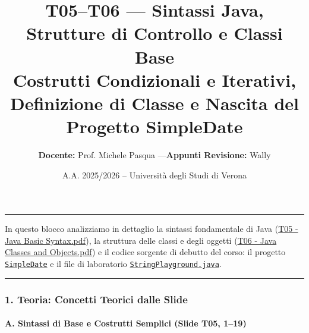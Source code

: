 \documentclass[11pt,a4paper]{article}
\title{\Huge\bfseries\sffamily\color{brandblue} T05–T06 --- Sintassi Java, Strutture di Controllo e Classi Base \\[0.3em] \large\sffamily Costrutti Condizionali e Iterativi, Definizione di Classe e Nascita del Progetto SimpleDate}
\author{\textbf{Docente:} Prof. Michele Pasqua \quad---\quad \textbf{Appunti Revisione:} Wally}
\date{A.A. 2025/2026 -- Universit\`a degli Studi di Verona}
\newcommand{\passthrough}[1]{#1}
\begin{document}
\maketitle
\thispagestyle{fancy}
\vspace{-1.2em}
\noindent\textcolor{brandblue}{\rule{\textwidth}{0.8pt}}
\vspace{1.2em}

In questo blocco analizziamo in dettaglio la sintassi fondamentale di
Java
(\href{file:///home/wally/Documenti/GitHub/Programmazione-II/25-26/Teoria-e-Esercitazioni/Slides-20260902/T05\%20-\%20Java\%20Basic\%20Syntax.pdf}{T05
- Java Basic Syntax.pdf}), la struttura delle classi e degli oggetti
(\href{file:///home/wally/Documenti/GitHub/Programmazione-II/25-26/Teoria-e-Esercitazioni/Slides-20260902/T06\%20-\%20Java\%20Classes\%20and\%20Objects.pdf}{T06
- Java Classes and Objects.pdf}) e il codice sorgente di debutto del
corso: il progetto
\href{file:///home/wally/Documenti/GitHub/Programmazione-II/25-26/Teoria-e-Esercitazioni/Codice-20260902/Lezioni05-06/SimpleDate}{\passthrough{\lstinline!SimpleDate!}}
e il file di laboratorio
\href{file:///home/wally/Documenti/GitHub/Programmazione-II/25-26/Teoria-e-Esercitazioni/Codice-20260902/Lezioni05-06/StringPlayground.java}{\passthrough{\lstinline!StringPlayground.java!}}.

\begin{center}\rule{0.5\linewidth}{0.5pt}\end{center}

\subsubsection{1. Teoria: Concetti Teorici dalle
Slide}\label{teoria-concetti-teorici-dalle-slide}

\paragraph{A. Sintassi di Base e Costrutti Semplici (Slide T05,
1--19)}\label{a.-sintassi-di-base-e-costrutti-semplici-slide-t05-119}
\end{document}
